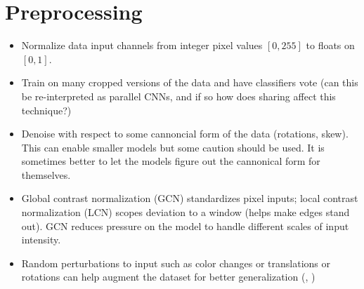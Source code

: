 \documentclass{article}
\begin{document}
\section{Preprocessing}

\begin{itemize}
\item Normalize data input channels from integer pixel values $[0,255]$ to floats on $[0,1]$.
\item Train on many cropped versions of the data and have classifiers vote (can this be re-interpreted as parallel CNNs, and if so how does sharing affect this technique?)
\item Denoise with respect to some cannoncial form of the data (rotations, skew). This can enable smaller models but some caution should be used. It is sometimes better to let the models figure out the cannonical form for themselves.
\item Global contrast normalization (GCN) standardizes pixel inputs; local contrast normalization (LCN) scopes deviation to a window (helps make edges stand out). GCN reduces pressure on the model to handle different scales of input intensity.
\item Random perturbations to input such as color changes or translations or rotations can help augment the dataset for better generalization (, )
\end{itemize}
\end{document}
